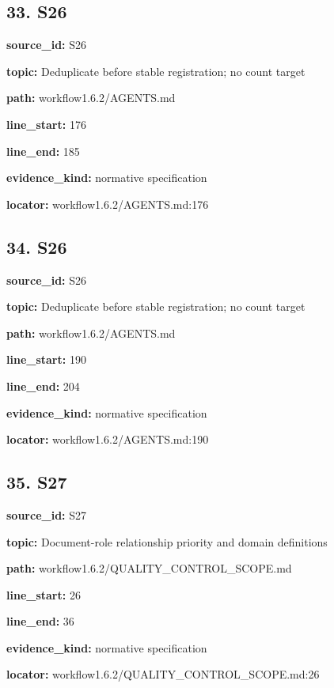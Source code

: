 \documentclass[10pt,a4paper]{article}
\begin{document}
\subsection*{33.\allowbreak{} S26}
\textbf{source\_\allowbreak{}id:} S26\par
\textbf{topic:} Deduplicate before stable registration; no count target\par
\textbf{path:} workflow1.\allowbreak{}6.\allowbreak{}2/\allowbreak{}AGENTS.\allowbreak{}md\par
\textbf{line\_\allowbreak{}start:} 176\par
\textbf{line\_\allowbreak{}end:} 185\par
\textbf{evidence\_\allowbreak{}kind:} normative specification\par
\textbf{locator:} workflow1.\allowbreak{}6.\allowbreak{}2/\allowbreak{}AGENTS.\allowbreak{}md:176\par
\subsection*{34.\allowbreak{} S26}
\textbf{source\_\allowbreak{}id:} S26\par
\textbf{topic:} Deduplicate before stable registration; no count target\par
\textbf{path:} workflow1.\allowbreak{}6.\allowbreak{}2/\allowbreak{}AGENTS.\allowbreak{}md\par
\textbf{line\_\allowbreak{}start:} 190\par
\textbf{line\_\allowbreak{}end:} 204\par
\textbf{evidence\_\allowbreak{}kind:} normative specification\par
\textbf{locator:} workflow1.\allowbreak{}6.\allowbreak{}2/\allowbreak{}AGENTS.\allowbreak{}md:190\par
\subsection*{35.\allowbreak{} S27}
\textbf{source\_\allowbreak{}id:} S27\par
\textbf{topic:} Document-\allowbreak{}role relationship priority and domain definitions\par
\textbf{path:} workflow1.\allowbreak{}6.\allowbreak{}2/\allowbreak{}QUALITY\_\allowbreak{}CONTROL\_\allowbreak{}SCOPE.\allowbreak{}md\par
\textbf{line\_\allowbreak{}start:} 26\par
\textbf{line\_\allowbreak{}end:} 36\par
\textbf{evidence\_\allowbreak{}kind:} normative specification\par
\textbf{locator:} workflow1.\allowbreak{}6.\allowbreak{}2/\allowbreak{}QUALITY\_\allowbreak{}CONTROL\_\allowbreak{}SCOPE.\allowbreak{}md:26\par
\end{document}
